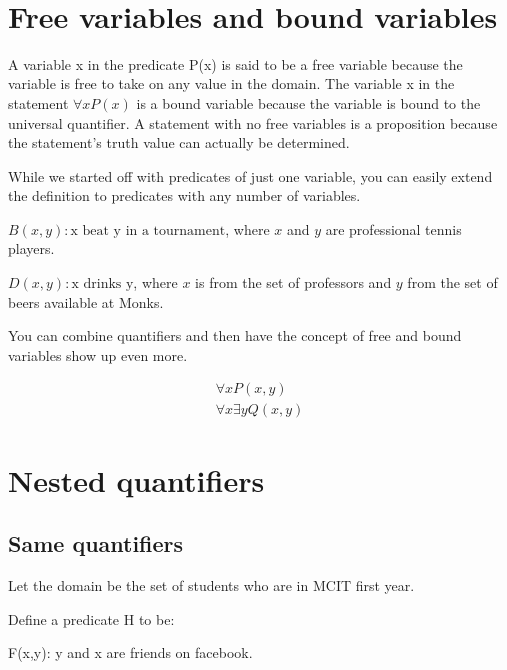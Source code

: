 \documentclass[12pt]{article}
\begin{document}
\begin{center}
\\
\vspace{1cm}
\end{center}

\vspace{0.5cm}\noindent

\section*{Free variables and bound variables}
A variable x in the predicate P(x) is said to be a free variable because the variable is free to take on any value in the domain. The variable x in the statement $\forall x P(x)$ is a bound variable because the variable is bound to the universal quantifier. A statement with no free variables is a proposition because the statement's truth value can actually be determined. 

While we started off with predicates of just one variable, you can easily extend the definition to predicates with any number of variables.

$B(x,y): \text{x beat y in a tournament}$, where $x$ and $y$ are professional tennis players.

$D(x,y): \text{x drinks y}$, where $x$ is from the set of professors and $y$ from the set of beers available at Monks.  

You can combine quantifiers and then have the concept of free and bound variables show up even more.

\begin{align*}
\forall x P(x,y) \tag{x is a bound variable, but y is free} \\
\forall x \exists y Q(x,y) \tag{x and y are both bound}
\end{align*}

\section*{Nested quantifiers}

\subsection*{Same quantifiers}

Let the domain be the set of students who are in MCIT first year.

Define a predicate H to be:

F(x,y): y and x are friends on facebook.
\end{document}
